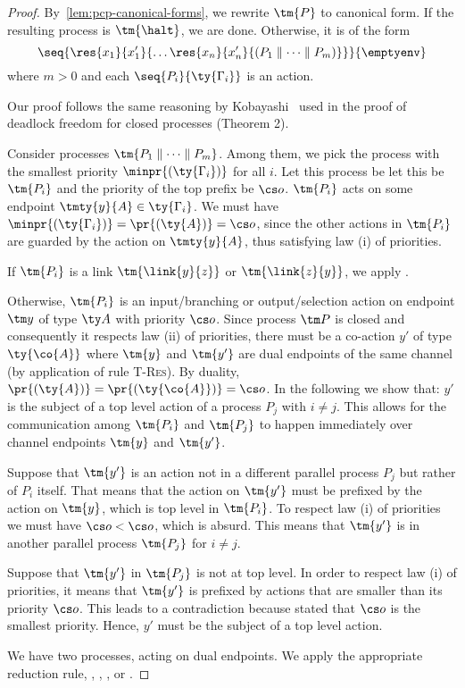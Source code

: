 \begin{proof}
  \label{prf:thm-pcp-closed-progress}
  By~\cref{lem:pcp-canonical-forms}, we rewrite $\tm{P}$ to canonical form. If the resulting process is $\tm{\halt}$, we are done. Otherwise, it is of the form
  \[
    \seq{\res{x_1}{x'_1}{\dots\res{x_n}{x'_n}{(P_1 \parallel\dots\parallel P_m)}}}{\emptyenv}
  \]
  where $m>0$ and each $\seq{P_i}{\ty{\Gamma_i}}$ is an action.

  Our proof follows the same reasoning by Kobayashi~\cite{kobayashi06} used in the proof of deadlock freedom for closed processes (Theorem 2). 

  Consider processes $\tm {P_1 \parallel\dots\parallel P_m}$. Among them, we pick the process with the smallest priority $\minpr{(\ty{\Gamma_i})}$ for all $i$. Let this process be let this be $\tm{P_i}$ and the priority of the top prefix be $\cs o$. $\tm{P_i}$ acts on some endpoint $\tmty{y}{A}\in\ty{\Gamma_i}$. We must have $\minpr{(\ty{\Gamma_i})}=\pr{(\ty{A})} = \cs o$, since the other actions in $\tm{P_i}$ are guarded by the action on $\tmty{y}{A}$, thus satisfying law (i) of priorities.

  If $\tm{P_i}$ is a link $\tm{\link{y}{z}}$ or $\tm{\link{z}{y}}$, we apply .

  Otherwise, $\tm{P_i}$ is an input/branching or output/selection action on endpoint $\tm y$ of type $\ty A$ with priority $\cs o$. Since process $\tm P$ is closed and consequently it respects law (ii) of priorities, there must be a co-action $y'$ of type $\ty{\co{A}}$  where $\tm{y}$ and $\tm{y'}$ are dual endpoints of the same channel (by application of rule \textsc{T-Res}). By duality, $\pr{(\ty{A})}=\pr{(\ty{\co{A}})}= \cs o$. In the following we show that: $y'$ is the subject of a top level action of a process $P_j$ with $i\neq j$. This allows for the communication among $\tm{P_i}$ and $\tm{P_j}$ to happen immediately over channel endpoints $\tm{y}$ and $\tm{y'}$.
  
  Suppose that $\tm{y'}$ is an action not in a different parallel process $P_j$ but rather of $P_i$ itself. That means that the action on $\tm{y'}$ must be prefixed by the action on $\tm{y}$, which is top level in $\tm{P_i}$. To respect law (i) of priorities we must have $\cs o < \cs o$, which is absurd. This means that $\tm{y'}$ is in another parallel process $\tm{P_j}$ for $i\neq j$.

  Suppose that $\tm{y'}$ in $\tm{P_j}$ is not at top level. In order to respect law (i) of priorities, it means that $\tm{y'}$ is prefixed by actions that are smaller than its priority $\cs o$. This leads to a contradiction because stated that $\cs o$ is the smallest priority. Hence, $y'$ must be the subject of a top level action.
  
  We have two processes, acting on dual endpoints. We apply the appropriate reduction rule, \ie {}, , , or .
\end{proof}

